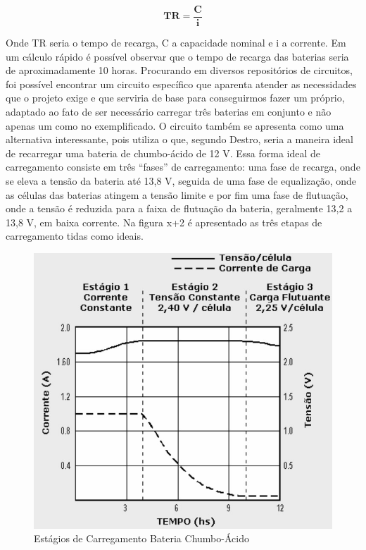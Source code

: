 \begin{equation}
\label{eq:tempo_carregamento}
\mathbf{TR = \frac{C}{i}}
\end{equation}

Onde TR seria o tempo de recarga, C a capacidade nominal e i a corrente. 
Em um cálculo rápido é possível observar que o tempo de recarga das baterias seria de aproximadamente 10 horas. 
Procurando em diversos repositórios de circuitos, foi possível encontrar um circuito específico que aparenta atender as necessidades que o projeto exige e que serviria de base para conseguirmos fazer um próprio, adaptado ao fato de ser necessário carregar três baterias em conjunto e não apenas um como no exemplificado. O circuito também se apresenta como uma alternativa interessante, pois utiliza o que, segundo Destro, seria a maneira ideal de recarregar uma bateria de chumbo-ácido de 12 V. 
Essa forma ideal de carregamento consiste em três “fases” de carregamento: uma fase de recarga, onde se eleva a tensão da bateria até 13,8 V, seguida de uma fase de equalização, onde as células das baterias atingem a tensão limite e por fim uma fase de flutuação, onde a tensão é reduzida para a faixa de flutuação da bateria, geralmente 13,2 a 13,8 V, em baixa corrente. Na figura x+2 é apresentado as três etapas de carregamento tidas como ideais.

\newpage

	\begin{figure}[!htb]
		\centering
		\includegraphics[scale=0.4]{estagio_carregamento.jpeg}
		\caption{Estágios de Carregamento Bateria Chumbo-Ácido}
		\label{img:estagiocarregamento}
	\end{figure}

